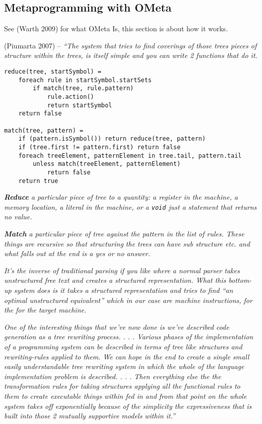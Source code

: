 \hypertarget{metaprogramming-with-ometa}{%
\subsection{\texorpdfstring{Metaprogramming with
\textbf{OMeta}}{Metaprogramming with OMeta}}\label{metaprogramming-with-ometa}}

See (Warth 2009) for what OMeta Is, this section is about how it works.

(Piumarta 2007) -- \emph{``The system that tries to find coverings of
those trees pieces of structure within the trees, is itself simple and
you can write 2 functions that do it.}

\begin{verbatim}
reduce(tree, startSymbol) =
    foreach rule in startSymbol.startSets
        if match(tree, rule.pattern)
            rule.action()
            return startSymbol
    return false

match(tree, pattern) =
    if (pattern.isSymbol()) return reduce(tree, pattern)
    if (tree.first != pattern.first) return false
    foreach treeElement, patternElement in tree.tail, pattern.tail
        unless match(treeElement, patternElement)
            return false
    return true
\end{verbatim}

\emph{\textbf{Reduce} a particular piece of tree to a quantity: a
register in the machine, a memory location, a literal in the machine, or
a \texttt{void} just a statement that returns no value.}

\emph{\textbf{Match} a particular piece of tree against the pattern in
the list of rules. These things are recursive so that structuring the
trees can have sub structure etc. and what falls out at the end is a yes
or no answer.}

\emph{It's the inverse of traditional parsing if you like where a normal
parser takes unstructured free text and creates a structured
representation. What this bottom-up system does is it takes a structured
representation and tries to find ``an optimal unstructured equivalent''
which in our case are machine instructions, for the for the target
machine.}

\emph{One of the interesting things that we've now done is we've
described code generation as a tree rewriting process. . . . Various
phases of the implementation of a programming system can be described in
terms of tree like structures and rewriting-rules applied to them. We
can hope in the end to create a single small easily understandable tree
rewriting system in which the whole of the language implementation
problem is described. . . . Then everything else the the transformation
rules for taking structures applying all the functional rules to them to
create executable things within fed in and from that point on the whole
system takes off exponentially because of the simplicity the
expressiveness that is built into those 2 mutually supportive models
within it.''}

